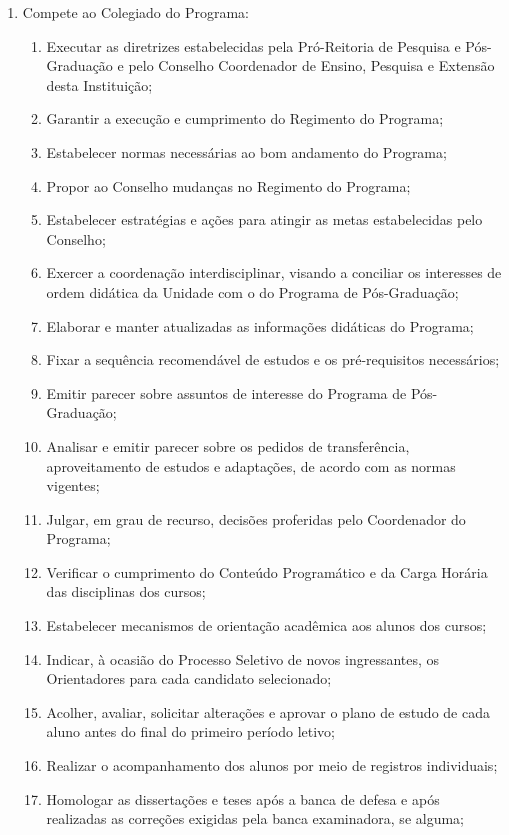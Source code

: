 \documentclass{article}
\newcommand{\grupoMenor}{Colegiado\xspace}
\newcommand{\grupoMaior}{Conselho\xspace}
\begin{document}
\begin{enumerate}
	\item Compete ao \grupoMenor do Programa:
	\begin{enumerate}[label=\Roman*]
		\item Executar as diretrizes estabelecidas pela Pró-Reitoria de Pesquisa e Pós-Graduação e pelo Conselho Coordenador de Ensino, Pesquisa e Extensão desta Instituição; %
		\item Garantir a execução e cumprimento do Regimento do Programa;
		\item Estabelecer normas necessárias ao bom andamento do Programa;
		\item Propor ao \grupoMaior mudanças no Regimento do Programa;
		\item Estabelecer estratégias e ações para atingir as metas estabelecidas pelo \grupoMaior;
		\item Exercer a coordenação interdisciplinar, visando a conciliar os interesses de ordem didática da Unidade com o do Programa de Pós-Graduação;
		\item Elaborar e manter atualizadas as informações didáticas do Programa;
		\item Fixar a sequência recomendável de estudos e os pré-requisitos necessários;
		\item Emitir parecer sobre assuntos de interesse do Programa de Pós-Graduação;
		\item Analisar e emitir parecer sobre os pedidos de transferência, aproveitamento de estudos e adaptações, de acordo com as normas vigentes;
		\item Julgar, em grau de recurso, decisões proferidas pelo Coordenador do Programa;
		\item Verificar o cumprimento do Conteúdo Programático e da Carga Horária das disciplinas dos cursos;
		\item Estabelecer mecanismos de orientação acadêmica aos alunos dos cursos;
		\item Indicar, à ocasião do Processo Seletivo de novos ingressantes, os Orientadores para cada candidato selecionado; %
		\item Acolher, avaliar, solicitar alterações e aprovar o plano de estudo de cada aluno antes do final do primeiro período letivo; 
		\item Realizar o acompanhamento dos alunos por meio de registros individuais;
		\item Homologar as dissertações e teses após a banca de defesa e após realizadas as correções exigidas pela banca examinadora, se alguma;

\end{enumerate}
\end{enumerate}
\end{document}
